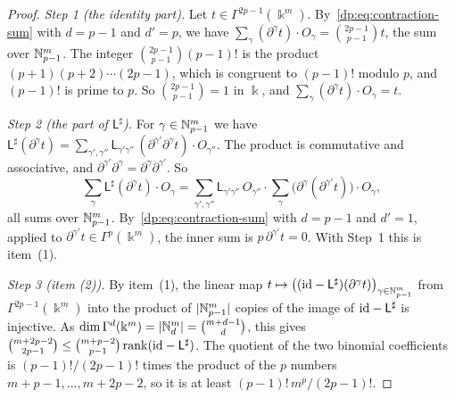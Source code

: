 \begin{proof}
\emph{Step 1 (the identity part).} Let $t\in\Gamma^{2p-1}(\Bbbk^m)$. By~\eqref{dp:eq:contraction-sum} with $d=p-1$ and $d'=p$, we have $\sum_\gamma(\partial^\gamma t)\cdot O_\gamma=\binom{2p-1}{p-1}t$, the sum over $\mathbb N^m_{p-1}$. The integer $\binom{2p-1}{p-1}(p-1)!$ is the product $(p+1)(p+2)\cdots(2p-1)$, which is congruent to $(p-1)!$ modulo $p$, and $(p-1)!$ is prime to $p$. So $\binom{2p-1}{p-1}=1$ in $\Bbbk$, and $\sum_\gamma(\partial^\gamma t)\cdot O_\gamma=t$.

\emph{Step 2 (the part of $\mathsf L^\sharp$).} For $\gamma\in\mathbb N^m_{p-1}$ we have $\mathsf L^\sharp(\partial^\gamma t)=\sum_{\gamma',\gamma''}\mathsf L_{\gamma'\gamma''}\,(\partial^{\gamma'}\partial^\gamma t)\cdot O_{\gamma''}$. The product is commutative and associative, and $\partial^{\gamma'}\partial^\gamma=\partial^\gamma\partial^{\gamma'}$. So
\[
 \sum_\gamma\mathsf L^\sharp(\partial^\gamma t)\cdot O_\gamma
 =\sum_{\gamma',\gamma''}\mathsf L_{\gamma'\gamma''}\,O_{\gamma''}\cdot
 \sum_\gamma\bigl(\partial^\gamma(\partial^{\gamma'}t)\bigr)\cdot O_\gamma,
\]
all sums over $\mathbb N^m_{p-1}$. By~\eqref{dp:eq:contraction-sum} with $d=p-1$ and $d'=1$, applied to $\partial^{\gamma'}t\in\Gamma^p(\Bbbk^m)$, the inner sum is $p\,\partial^{\gamma'}t=0$. With Step~1 this is item~(1).

\emph{Step 3 (item (2)).} By item~(1), the linear map $t\mapsto\bigl((\mathrm{id}-\mathsf L^\sharp)(\partial^\gamma t)\bigr)_{\gamma\in\mathbb N^m_{p-1}}$ from $\Gamma^{2p-1}(\Bbbk^m)$ into the product of $\lvert \mathbb N^m_{p-1}\rvert$ copies of the image of $\mathrm{id}-\mathsf L^\sharp$ is injective. As $\dim\Gamma^d(\Bbbk^m)=\lvert \mathbb N^m_d\rvert=\binom{m+d-1}d$, this gives $\binom{m+2p-2}{2p-1}\le\binom{m+p-2}{p-1}\operatorname{rank}(\mathrm{id}-\mathsf L^\sharp)$. The quotient of the two binomial coefficients is $(p-1)!/(2p-1)!$ times the product of the $p$ numbers $m+p-1,\dots,m+2p-2$, so it is at least $(p-1)!\,m^p/(2p-1)!$.
\end{proof}

